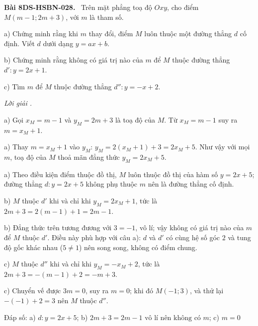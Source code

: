 \documentclass[12pt,a4paper]{article}
\newenvironment{problem}[1][]{\par\medskip\noindent\textbf{Bài #1.}\ }{\par}
\newenvironment{solution}[1][]{\par\noindent\textit{Lời giải #1.}\par}{\par}
\begin{document}
\begin{problem}[8DS-HSBN-028]
Trên mặt phẳng toạ độ $Oxy$, cho điểm $M(m - 1; 2m + 3)$, với $m$ là tham số.

a) Chứng minh rằng khi $m$ thay đổi, điểm $M$ luôn thuộc một đường thẳng $d$ cố định. Viết $d$ dưới dạng $y = ax + b$.

b) Chứng minh rằng không có giá trị nào của $m$ để $M$ thuộc đường thẳng $d'\colon y = 2x + 1$.

c) Tìm $m$ để $M$ thuộc đường thẳng $d''\colon y = -x + 2$.

\begin{solution}
a) Gọi $x_M = m - 1$ và $y_M = 2m + 3$ là toạ độ của $M$. Từ $x_M = m - 1$ suy ra $m = x_M + 1$.

a) Thay $m = x_M + 1$ vào $y_M$: $y_M = 2(x_M + 1) + 3 = 2x_M + 5$. Như vậy với mọi $m$, toạ độ của $M$ thoả mãn đẳng thức $y_M = 2x_M + 5$.

a) Theo điều kiện điểm thuộc đồ thị, $M$ luôn thuộc đồ thị của hàm số $y = 2x + 5$; đường thẳng $d\colon y = 2x + 5$ không phụ thuộc $m$ nên là đường thẳng cố định.

b) $M$ thuộc $d'$ khi và chỉ khi $y_M = 2x_M + 1$, tức là $2m + 3 = 2(m - 1) + 1 = 2m - 1$.

b) Đẳng thức trên tương đương với $3 = -1$, vô lí; vậy không có giá trị nào của $m$ để $M$ thuộc $d'$. Điều này phù hợp với câu a): $d$ và $d'$ có cùng hệ số góc $2$ và tung độ gốc khác nhau ($5 \neq 1$) nên song song, không có điểm chung.

c) $M$ thuộc $d''$ khi và chỉ khi $y_M = -x_M + 2$, tức là $2m + 3 = -(m - 1) + 2 = -m + 3$.

c) Chuyển vế được $3m = 0$, suy ra $m = 0$; khi đó $M(-1; 3)$, và thử lại $-(-1) + 2 = 3$ nên $M$ thuộc $d''$.

Đáp số: a) $\boxed{d\colon y = 2x + 5}$; b) $\boxed{2m + 3 = 2m - 1 \text{ vô lí nên không có } m}$; c) $\boxed{m = 0}$
\end{solution}
\end{problem}
\end{document}
